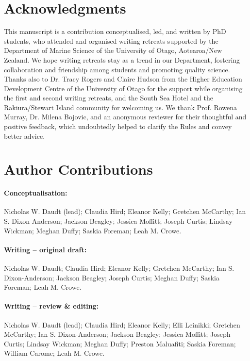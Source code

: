 \documentclass[10pt,letterpaper]{article}
\begin{document}
\section*{Acknowledgments}
This manuscript is a contribution conceptualised, led, and written by PhD students, who attended and organised writing retreats supported by the Department of Marine Science of the University of Otago, Aotearoa/New Zealand. We hope writing retreats stay as a trend in our Department, fostering collaboration and friendship among students and promoting quality science. Thanks also to Dr. Tracy Rogers and Claire Hudson from the Higher Education Development Centre of the University of Otago for the support while organising the first and second writing retreats, and the South Sea Hotel and the Rakiura/Stewart Island community for welcoming us. We thank Prof. Rowena Murray, Dr. Milena Bojovic, and an anonymous reviewer for their thoughtful and positive feedback, which undoubtedly helped to clarify the Rules and convey better advice.

\section*{Author Contributions}

\paragraph*{Conceptualisation:} Nicholas W. Daudt (lead); Claudia Hird; Eleanor Kelly; Gretchen McCarthy; Ian S. Dixon-Anderson; Jackson Beagley; Jessica Moffitt; Joseph Curtis; Lindsay Wickman; Meghan Duffy; Saskia Foreman; Leah M. Crowe.

\paragraph*{Writing – original draft:} Nicholas W. Daudt; Claudia Hird; Eleanor Kelly; Gretchen McCarthy; Ian S. Dixon-Anderson; Jackson Beagley; Joseph Curtis; Meghan Duffy; Saskia Foreman; Leah M. Crowe.

\paragraph*{Writing – review \& editing:} Nicholas W. Daudt (lead); Claudia Hird; Eleanor Kelly; Elli Leinikki; Gretchen McCarthy; Ian S. Dixon-Anderson; Jackson Beagley; Jessica Moffitt; Joseph Curtis; Lindsay Wickman; Meghan Duffy; Preston Maluafiti; Saskia Foreman; William Carome; Leah M. Crowe.
\end{document}
